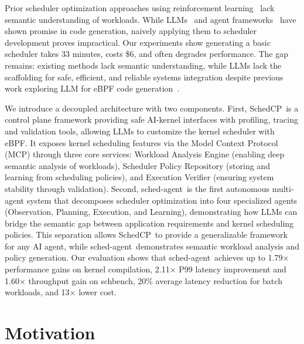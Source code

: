 \documentclass[preprint]{article}
\newcommand{\sys}{SchedCP\xspace}
\newcommand{\agent}{sched-agent\xspace}
\begin{document}
Prior scheduler optimization approaches using reinforcement learning~\cite{mao2019decima,qiu2020firm} lack semantic understanding of workloads. While LLMs~\cite{openai2023gpt4,anthropic2024claude} and agent frameworks~\cite{autogen,geminicli,claudecode,qian2024chatdev,hong2023metagpt} have shown promise in code generation, naively applying them to scheduler development proves impractical. Our experiments show generating a basic scheduler takes 33 minutes, costs \$6, and often degrades performance. The gap remains: existing methods lack semantic understanding, while LLMs lack the scaffolding for safe, efficient, and reliable systems integration despite previous work exploring LLM for eBPF code generation~\cite{kgent}.

We introduce a decoupled architecture with two components. First, \sys\ is a control plane framework providing safe AI-kernel interfaces with profiling, tracing and validation tools, allowing LLMs to customize the kernel scheduler with eBPF. It exposes kernel scheduling features via the Model Context Protocol (MCP) through three core services: Workload Analysis Engine (enabling deep semantic analysis of workloads), Scheduler Policy Repository (storing and learning from scheduling policies), and Execution Verifier (ensuring system stability through validation). Second, \agent\ is the first autonomous multi-agent system that decomposes scheduler optimization into four specialized agents (Observation, Planning, Execution, and Learning), demonstrating how LLMs can bridge the semantic gap between application requirements and kernel scheduling policies. This separation allows \sys\ to provide a generalizable framework for any AI agent, while \agent\ demonstrates semantic workload analysis and policy generation. Our evaluation shows that \agent\ achieves up to 1.79× performance gains on kernel compilation, 2.11× P99 latency improvement and 1.60× throughput gain on schbench, 20\% average latency reduction for batch workloads, and 13× lower cost.

\section{Motivation}
\label{sec:motivation}
\end{document}
